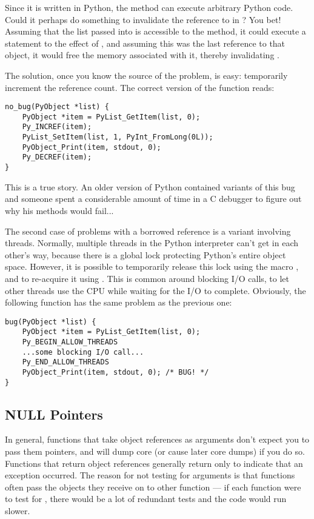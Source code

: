Since it is written in Python, the  method can execute
arbitrary Python code.  Could it perhaps do something to invalidate
the reference to  in ?  You bet!  Assuming that
the list passed into  is accessible to the
 method, it could execute a statement to the effect of
, and assuming this was the last reference to that
object, it would free the memory associated with it, thereby
invalidating .

The solution, once you know the source of the problem, is easy:
temporarily increment the reference count.  The correct version of the
function reads:

\begin{verbatim}
no_bug(PyObject *list) {
    PyObject *item = PyList_GetItem(list, 0);
    Py_INCREF(item);
    PyList_SetItem(list, 1, PyInt_FromLong(0L));
    PyObject_Print(item, stdout, 0);
    Py_DECREF(item);
}
\end{verbatim}

This is a true story.  An older version of Python contained variants
of this bug and someone spent a considerable amount of time in a C
debugger to figure out why his  methods would fail...

The second case of problems with a borrowed reference is a variant
involving threads.  Normally, multiple threads in the Python
interpreter can't get in each other's way, because there is a global
lock protecting Python's entire object space.  However, it is possible
to temporarily release this lock using the macro
, and to re-acquire it using
.  This is common around blocking I/O
calls, to let other threads use the CPU while waiting for the I/O to
complete.  Obviously, the following function has the same problem as
the previous one:

\begin{verbatim}
bug(PyObject *list) {
    PyObject *item = PyList_GetItem(list, 0);
    Py_BEGIN_ALLOW_THREADS
    ...some blocking I/O call...
    Py_END_ALLOW_THREADS
    PyObject_Print(item, stdout, 0); /* BUG! */
}
\end{verbatim}

\subsection{NULL Pointers}

In general, functions that take object references as arguments don't
expect you to pass them  pointers, and will dump core (or
cause later core dumps) if you do so.  Functions that return object
references generally return  only to indicate that an
exception occurred.  The reason for not testing for 
arguments is that functions often pass the objects they receive on to
other function --- if each function were to test for ,
there would be a lot of redundant tests and the code would run slower.

